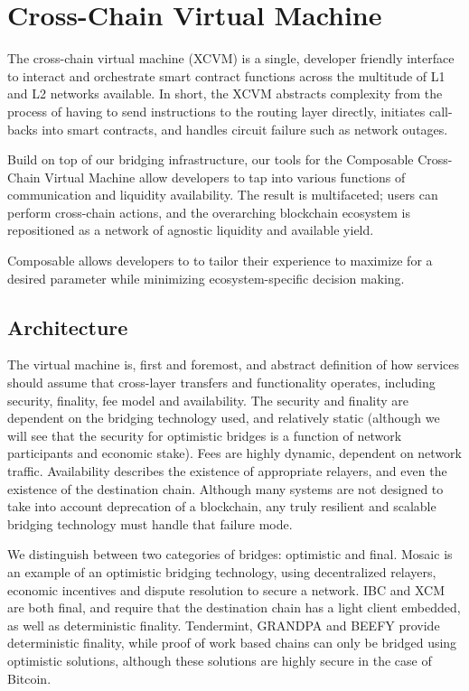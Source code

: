 \section{Cross-Chain Virtual Machine\label{sec:xcvm}}
The cross-chain virtual machine (XCVM) is a single, developer friendly interface to interact and orchestrate smart contract functions across the multitude of L1 and L2 networks available. In short, the XCVM abstracts complexity from the process of having to send instructions to the routing layer directly, initiates call-backs into smart contracts, and handles circuit failure such as network outages.

Build on top of our bridging infrastructure, our tools for the Composable Cross-Chain Virtual Machine allow developers to tap into various functions of communication and liquidity availability. The result is multifaceted; users can perform cross-chain actions, and the overarching blockchain ecosystem is repositioned as a network of agnostic liquidity and available yield.

Composable allows developers to to tailor their experience to maximize for a desired parameter while minimizing ecosystem-specific decision making.

\subsection{Architecture\label{sec:xcvmarch}}
The virtual machine is, first and foremost, and abstract definition of how services should assume that cross-layer transfers and functionality operates, including security, finality, fee model and availability. The security and finality are dependent on the bridging technology used, and relatively static (although we will see that the security for optimistic bridges is a function of network participants and economic stake). Fees are highly dynamic, dependent on network traffic. Availability describes the existence of appropriate relayers, and even the existence of the destination chain. Although many systems are not designed to take into account deprecation of a blockchain, any truly resilient and scalable bridging technology must handle that failure mode.

We distinguish between two categories of bridges: optimistic and final. Mosaic is an example of an optimistic bridging technology, using decentralized relayers, economic incentives and dispute resolution to secure a network. IBC and XCM are both final, and require that the destination chain has a light client embedded, as well as deterministic finality. Tendermint, GRANDPA and BEEFY provide deterministic finality, while proof of work based chains can only be bridged using optimistic solutions, although these solutions are highly secure in the case of Bitcoin.

